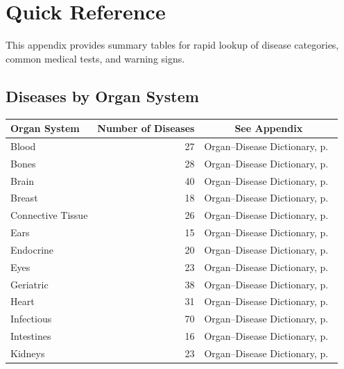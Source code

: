 \chapter*{Quick Reference}

This appendix provides summary tables for rapid lookup of disease
categories, common medical tests, and warning signs.

\section*{Diseases by Organ System}
\label{sec:quickref_organs}

\begin{tabularx}{\textwidth}{lrc}
\toprule
\textbf{Organ System} & \textbf{Number of Diseases} & \textbf{See Appendix} \\
\midrule
Blood                & 27  & Organ--Disease Dictionary, p.~\pageref{sec:organ_blood} \\
Bones                & 28  & Organ--Disease Dictionary, p.~\pageref{sec:organ_bones} \\
Brain                & 40  & Organ--Disease Dictionary, p.~\pageref{sec:organ_brain} \\
Breast               & 18  & Organ--Disease Dictionary, p.~\pageref{sec:organ_breast} \\
Connective Tissue    & 26  & Organ--Disease Dictionary, p.~\pageref{sec:organ_connective} \\
Ears                 & 15  & Organ--Disease Dictionary, p.~\pageref{sec:organ_ears} \\
Endocrine            & 20  & Organ--Disease Dictionary, p.~\pageref{sec:organ_endocrine} \\
Eyes                 & 23  & Organ--Disease Dictionary, p.~\pageref{sec:organ_eyes} \\
Geriatric            & 38  & Organ--Disease Dictionary, p.~\pageref{sec:organ_geriatric} \\
Heart                & 31  & Organ--Disease Dictionary, p.~\pageref{sec:organ_heart} \\
Infectious           & 70  & Organ--Disease Dictionary, p.~\pageref{sec:organ_infectious} \\
Intestines           & 16  & Organ--Disease Dictionary, p.~\pageref{sec:organ_intestines} \\
Kidneys              & 23  & Organ--Disease Dictionary, p.~\pageref{sec:organ_kidneys} \\

\end{tabularx}
